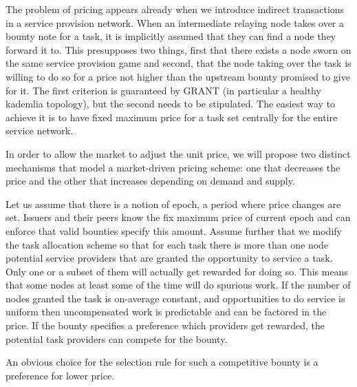 
The problem of pricing appears already when we introduce indirect transactions in a service provision network. When an intermediate relaying node takes over a bounty note for a task, it is implicitly assumed that they can find a node they forward it to. This presupposes two things, first that there exists a node sworn on the same service provision game and second, that the node taking over the task is willing to do so for a price not higher than the upstream bounty promised to give for it. The first criterion is guaranteed by GRANT (in particular a healthy kademlia topology), but the second needs to be stipulated. The easiest way to achieve it is to have fixed maximum price for a task set centrally for the entire service network. 

In order to allow the market to adjust the unit price, we will propose two distinct mechanisms that model a market-driven pricing scheme: one that decreases the price and the other that increases depending on demand and supply.





Let us assume that there is a notion of epoch, a period where price changes are set. Issuers and their peers know the fix maximum price of current epoch and can enforce that valid bounties specify this amount. 
Assume further that we modify the task allocation scheme so that for each task there is more than one node potential service providers that are granted the opportunity to service a task. Only one or a subset of them will actually get rewarded for doing so. 
This means that some nodes at least some of the time will do spurious work. If the number of nodes granted the task is on-average constant, and opportunities to do service is uniform then uncompensated work is  predictable and can be factored in the price. 
If the bounty specifies a preference which providers get rewarded, 
the potential task providers can compete for the bounty.

An obvious choice for the selection rule for such a competitive bounty is a preference for lower price. 
